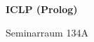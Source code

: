 \documentclass[a4paper]{article}
\begin{document}
\printGenericVSLHeader
\begin{center}
\begin{vsltext}{3cm}{4cm}

   \vspace{0.5cm} 

   \textbf{ICLP (Prolog)} 

    \vspace{1.5cm}

    Seminarraum 134A

\end{vsltext}

\end{center}
\end{document}
